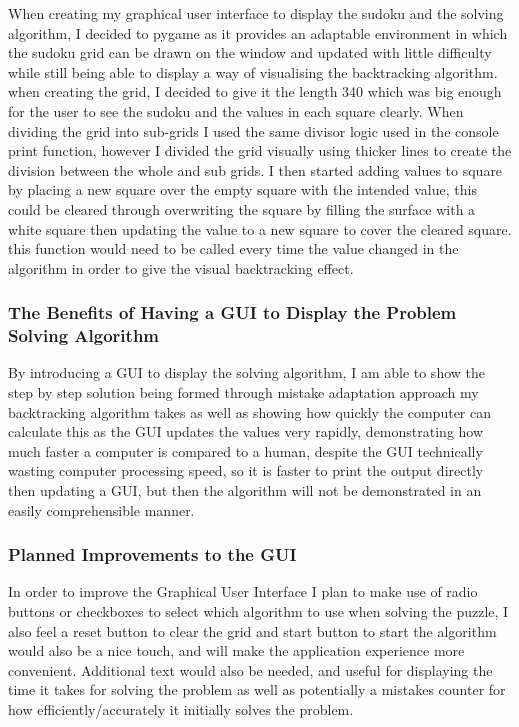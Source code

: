 \documentclass[]{final_report}
\begin{document}
When creating my graphical user interface to display the sudoku and the solving algorithm, I decided to pygame as it provides an adaptable environment in which the sudoku grid can be drawn on the window and updated with little difficulty while still being able to display a way of visualising the backtracking algorithm. when creating the grid, I decided to give it the length 340 which was big enough for the user to see the sudoku and the values in each square clearly. When dividing the grid into sub-grids I used the same divisor logic used in the console print function, however I divided the grid visually using thicker lines to create the division between the whole and sub grids. I then started adding values to square by placing a new square over the empty square with the intended value, this could be cleared through overwriting the square by filling the surface with a white square then updating the value to a new square to cover the cleared square. this function would need to be called every time the value changed in the algorithm in order to give the visual backtracking effect. 

\subsubsection{The Benefits of Having a GUI to Display the Problem Solving Algorithm} 

By introducing a GUI to display the solving algorithm, I am able to show the step by step solution being formed through mistake adaptation approach my backtracking algorithm takes as well as showing how quickly the computer can calculate this as the GUI updates the values very rapidly, demonstrating how much faster a computer is compared to a human, despite the GUI technically wasting computer processing speed, so it is faster to print the output directly then updating a GUI, but then the algorithm will not be demonstrated in an easily comprehensible manner. 

\subsubsection{Planned Improvements to the GUI} 

In order to improve the Graphical User Interface I plan to make use of radio buttons or checkboxes to select which algorithm to use when solving the puzzle, I also feel a reset button to clear the grid and start button to start the algorithm would also be a nice touch, and will make the application experience more convenient. Additional text would also be needed, and useful for displaying the time it takes for solving the problem as well as potentially a mistakes counter for how efficiently/accurately it initially solves the problem. 
\end{document}

